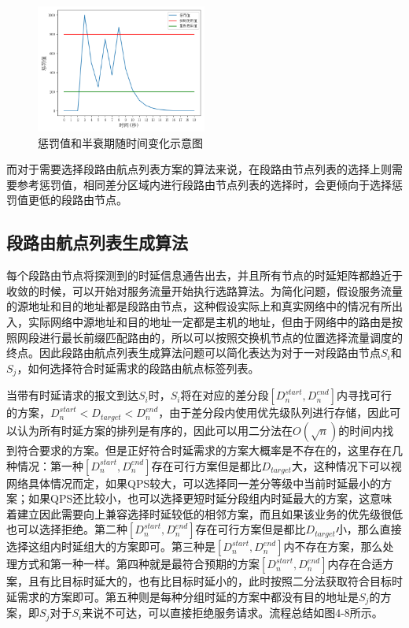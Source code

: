 \begin{figure}[htbp]
\setlength{\abovecaptionskip}{15pt plus 3pt minus 2pt}
\centerline{\includegraphics[width=0.5\textwidth]{./figures/ch4-penalty-value.png}}
\caption{惩罚值和半衰期随时间变化示意图}
\label{fig-ch4-penalty-value}
\end{figure}

而对于需要选择段路由航点列表方案的算法来说，在段路由节点列表的选择上则需要参考惩罚值，相同差分区域内进行段路由节点列表的选择时，会更倾向于选择惩罚值更低的段路由节点。

\subsection{段路由航点列表生成算法}

每个段路由节点将探测到的时延信息通告出去，并且所有节点的时延矩阵都趋近于收敛的时候，可以开始对服务流量开始执行选路算法。为简化问题，假设服务流量的源地址和目的地址都是段路由节点，这种假设实际上和真实网络中的情况有所出入，实际网络中源地址和目的地址一定都是主机的地址，但由于网络中的路由是按照网段进行最长前缀匹配路由的，所以可以按照交换机节点的位置选择流量调度的终点。因此段路由航点列表生成算法问题可以简化表达为对于一对段路由节点$S_i$和$S_j$，如何选择符合时延需求的段路由航点标签列表。

当带有时延请求的报文到达$S_i$时，$S_i$将在对应的差分段$[D_n^{start},D_n^{end}]$内寻找可行的方案，$D_n^{start}{<D}_{target}<D_n^{end}$，由于差分段内使用优先级队列进行存储，因此可以认为所有时延方案的排列是有序的，因此可以用二分法在$O\left(\sqrt n\right)$的时间内找到符合要求的方案。但是正好符合时延需求的方案大概率是不存在的，这里存在几种情况：第一种$[D_n^{start},D_n^{end}]$存在可行方案但是都比$D_{target}$大，这种情况下可以视网络具体情况而定，如果QPS较大，可以选择同一差分等级中当前时延最小的方案；如果QPS还比较小，也可以选择更短时延分段组内时延最大的方案，这意味着建立因此需要向上兼容选择时延较低的相邻方案，而且如果该业务的优先级很低也可以选择拒绝。第二种$[D_n^{start},D_n^{end}]$存在可行方案但是都比$D_{target}$小，那么直接选择这组内时延组大的方案即可。第三种是$\left[D_n^{start},D_n^{end}\right]$内不存在方案，那么处理方式和第一种一样。第四种就是最符合预期的方案$\left[D_n^{start},D_n^{end}\right]$内存在合适方案，且有比目标时延大的，也有比目标时延小的，此时按照二分法获取符合目标时延需求的方案即可。第五种则是每种分组时延的方案中都没有目的地址是$S_j$的方案，即$S_j$对于$S_i$来说不可达，可以直接拒绝服务请求。流程总结如图4-8所示。

